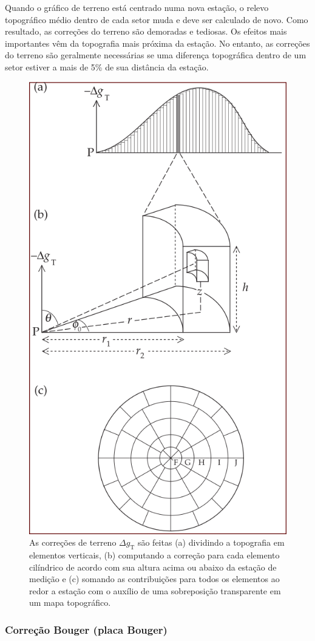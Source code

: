 \documentclass[]{book}
\theoremstyle{definition}
\theoremstyle{definition}
\theoremstyle{definition}
\theoremstyle{remark}
\begin{document}
Quando o gráfico de terreno está centrado numa nova estação, o relevo topográfico médio dentro de cada setor muda e deve ser calculado de novo. Como resultado, as correções do terreno são demoradas e tediosas. Os efeitos mais importantes vêm da topografia mais próxima da estação. No entanto, as correções do terreno são geralmente necessárias se uma diferença topográfica dentro de um setor estiver a mais de 5\% de sua distância da estação.

\begin{figure}

{\centering \includegraphics[width=0.6\linewidth]{fig/Fig_02.30} 

}

\caption{As correções de terreno $\Delta g_\mathrm{T}$ são feitas (a) dividindo a topografia em elementos verticais, (b) computando a correção para cada elemento cilíndrico de acordo com sua altura acima ou abaixo da estação de medição e (c) somando as contribuições para todos os elementos ao redor a estação com o auxílio de uma sobreposição transparente em um mapa topográfico.}\label{fig:terreno}
\end{figure}

\hypertarget{correcao-bouger-placa-bouger}{%
\subsubsection{Correção Bouger (placa Bouger)}\label{correcao-bouger-placa-bouger}}
\end{document}

